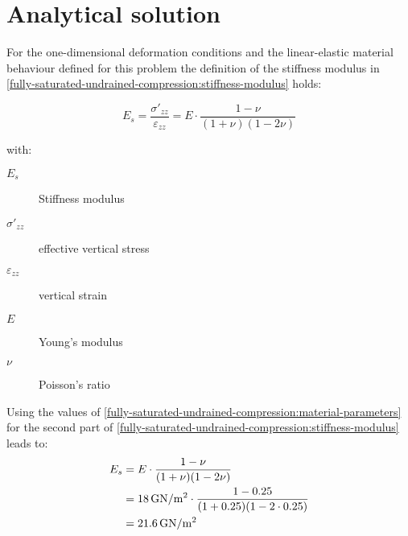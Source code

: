 \section{Analytical solution}
\label{fully-saturated-undrained-compression:sec:analytical-solution}

For the one-dimensional deformation conditions and the linear-elastic material
behaviour defined for this problem the definition of the stiffness modulus in
\autoref{fully-saturated-undrained-compression:stiffness-modulus} holds:

\begin{equation}
    \label{fully-saturated-undrained-compression:stiffness-modulus}
    E_s = \frac{\sigma'_{zz}}{\varepsilon_{zz}} = E \cdot \frac{1 - \nu}{(1 + \nu)(1 - 2 \nu)}
\end{equation}

\begin{samepage}
    with:
    \begin{description}
        \item[$E_s$] Stiffness modulus
        \item[$\sigma'_{zz}$] effective vertical stress
        \item[$\varepsilon_{zz}$] vertical strain
        \item[$E$] Young's modulus
        \item[$\nu$] Poisson's ratio
    \end{description}
\end{samepage}

Using the values of
\autoref{fully-saturated-undrained-compression:material-parameters} for the
second part of
\autoref{fully-saturated-undrained-compression:stiffness-modulus} leads to:
\begin{equation}
    \label{fully-saturated-undrained-compression:stiffness-modulus-value}
    \begin{split}
        E_s & = E \cdot \frac{1 - \nu}{(1 + \nu)(1 - 2 \nu)}                                                                       \\
            & = \SI{18}{\si[per-mode = symbol]{\giga\newton\per\square\metre}} \cdot \frac{1 - 0.25}{(1 + 0.25)(1 - 2 \cdot 0.25)} \\
            & = \SI{21.6}{\si[per-mode = symbol]{\giga\newton\per\square\metre}}
    \end{split}
\end{equation}

